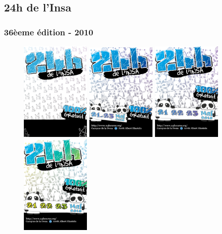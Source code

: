     \subsection{24h de l'Insa}
    
        \subsubsection{36èeme édition - 2010}
    
            \begin{figure}[h!]
                \centering        
                \includegraphics[width=0.3\textwidth]{img/preAffiche.png}     
                \includegraphics[width=0.3\textwidth]{img/preAffiche_panda.png}
                \includegraphics[width=0.3\textwidth]{img/preAffiche_panda_2.png}       
                \includegraphics[width=0.3\textwidth]{img/preAffiche_panda_2leaf_date1.png}

\end{figure}

